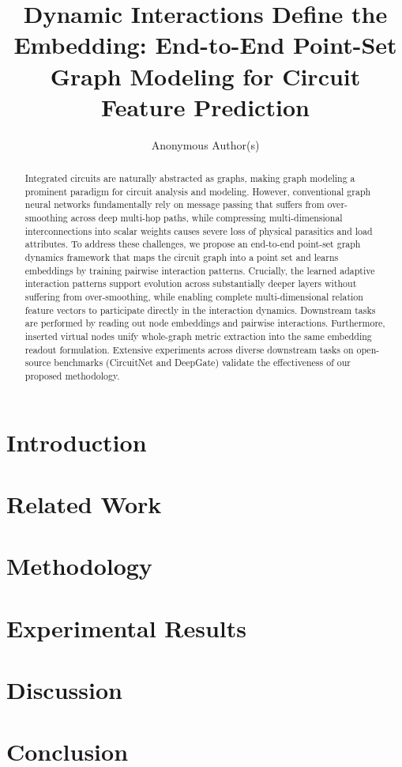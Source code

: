 \documentclass[sigconf, anonymous]{acmart}
\begin{document}
\title{Dynamic Interactions Define the Embedding: End-to-End Point-Set Graph Modeling for Circuit Feature Prediction}

\author{Anonymous Author(s)}

\begin{abstract}
Integrated circuits are naturally abstracted as graphs, making graph modeling a prominent paradigm for circuit analysis and modeling. However, conventional graph neural networks fundamentally rely on message passing that suffers from over-smoothing across deep multi-hop paths, while compressing multi-dimensional interconnections into scalar weights causes severe loss of physical parasitics and load attributes. To address these challenges, we propose an end-to-end point-set graph dynamics framework that maps the circuit graph into a point set and learns embeddings by training pairwise interaction patterns. Crucially, the learned adaptive interaction patterns support evolution across substantially deeper layers without suffering from over-smoothing, while enabling complete multi-dimensional relation feature vectors to participate directly in the interaction dynamics. Downstream tasks are performed by reading out node embeddings and pairwise interactions. Furthermore, inserted virtual nodes unify whole-graph metric extraction into the same embedding readout formulation. Extensive experiments across diverse downstream tasks on open-source benchmarks (CircuitNet and DeepGate) validate the effectiveness of our proposed methodology.
\end{abstract}

\maketitle

\section{Introduction}

\section{Related Work}

\section{Methodology}

\section{Experimental Results}

\section{Discussion}

\section{Conclusion}

\balance


\end{document}
